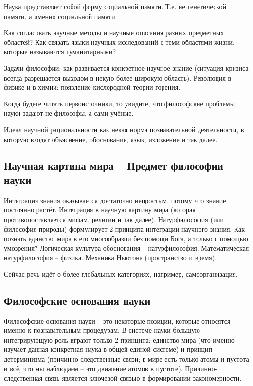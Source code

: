 \documentclass[main.tex]{subfiles}
\begin{document}
Наука представляет собой форму социальной памяти.
Т.е. не генетической памяти, а именно социальной памяти.

Как согласовать научные методы и научные описания разных предметных областей?
Как связать языки научных исследований с теми областями жизни, которые называются гуманитарными?

Задачи философии: как развивается конкретное научное знание (ситуация кризиса всегда разрешается выходом в некую более широкую область).
Революция в физике и в химии: появление кислородной теории горения.

Когда будете читать первоисточники, то увидите, что философские проблемы науки задают не философы, а сами учёные.

Идеал научной рациональности как некая норма познавательной деятельности, в которую входят объяснение, обоснование, язык, изложение и так далее.

\subsection{Научная картина мира -- Предмет философии науки}


Интеграция знания оказывается достаточно непростым, потому что знание постоянно растёт.
Интеграция в научную картину мира (которая противопоставляется мифам, религии и так далее).
Натурфилософия (или философия природы) формулирует 2 принципа интеграции научного знания.
Как познать единство мира в его многообразии без помощи Бога, а только с помощью умозрения?
Логическая культура обоснования -- натурфилософия.
Математическая натурфилософия -- физика.
Механика Ньютона (пространство и время).

Сейчас речь идёт о более глобальных категориях, например, самоорганизация.


\subsection{Философские основания науки}


Философские основания науки -- это некоторые позиции, которые относятся именно к познавательным процедурам.
В системе науки большую интегрирующую роль играют только 2 принципа: единство мира (что именно изучает данная конкретная наука в общей единой системе) и принцип детерминизма (причинно-следственные связи; в мире есть только атомы и пустота и всё, что мы наблюдаем -- это движение атомов в пустоте).
Причинно-следственная связь является ключевой связью в формировании закономерности.
\end{document}
